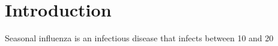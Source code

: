 \documentclass[sigchi]{acmart}
\begin{document}




\section{Introduction}

Seasonal influenza is an infectious disease that infects between 10 and 20%
\end{document}
